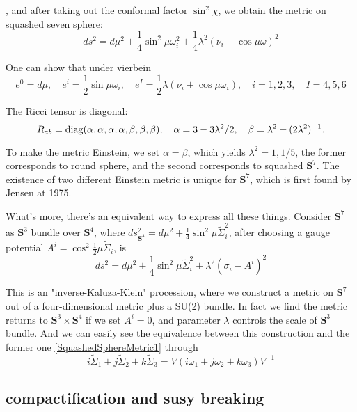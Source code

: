 \documentclass[12pt, a4paper]{article}
\numberwithin{equation}{section}
\newcommand{\be}{\begin{equation}}
\newcommand{\ee}{\end{equation}}
\begin{document}
	{\color{red}{The metric on the seven sphere is obtained by setting $\chi = $const}}, and after taking out the conformal factor $\sin^2\chi$, we obtain the metric on squashed seven sphere:
\be
	ds^2 = d\mu^2 +\frac{1}{4}\sin^2\mu\omega_i^2 + \frac{1}{4}\lambda^2 (\nu_i +\cos\mu \omega)^2
	\label{SquashedSphereMetric1}
\ee

	One can show that under vierbein
\be
	e^0 = d\mu, \quad e^i = \frac{1}{2}\sin\mu\omega_i,\quad e^I = \frac{1}{2}\lambda (\nu_i +\cos\mu\omega_i),\quad i = 1,2,3,\quad I = 4,5,6
\ee

	The Ricci tensor is diagonal:
\be
	R_{ab} = {\rm diag}(\alpha, \alpha, \alpha, \alpha, \beta, \beta, \beta),\quad \alpha = 3-3\lambda^2/2,\quad \beta = \lambda^2 + (2\lambda^2)^{-1}.
\ee
	
	To make the metric Einstein, we set $\alpha = \beta$, which yields $\lambda^2 = 1, 1/5$, the former corresponds to round sphere, and the second corresponds to squashed $\mathbf{S}^7$. The existence of two different Einstein metric is unique for $\mathbf{S}^7$, which is first found by Jensen at 1975.\cite{Jensen:1975}
	
	What's more, there's an equivalent way to express all these things. Consider $\mathbf{S}^7$ as $\mathbf{S}^3$ bundle over $\mathbf{S}^4$, where $ds^2_{\mathbf{S}^4} = d\mu^2 + \frac{1}{4}\sin^2\mu\tilde{\Sigma}_i^2$, after choosing a gauge potential $A^i = \cos^2\frac{1}{2}\mu\tilde{\Sigma}_i$, is
\be
	ds^2 = d\mu^2 + \frac{1}{4}\sin^2\mu\tilde{\Sigma}_i^2 + \lambda^2 (\sigma_i - A^i)^2
	\label{nextDs2}
\ee

	This is an "inverse-Kaluza-Klein" procession, where we construct a metric on $\mathbf{S}^7$ out of a four-dimensional metric plus a SU(2) bundle. In fact we find the metric returns to $\mathbf{S}^3 \times \mathbf{S}^4$ if we set $A^i = 0$, and parameter $\lambda$ controls the scale of $\mathbf{S}^3$ bundle. And we can easily see the equivalence between this construction and the former one \ref{SquashedSphereMetric1} through
\be
	i\tilde{\Sigma}_1 + j\tilde{\Sigma}_2 + k\tilde{\Sigma}_3 = V(i\omega_1  + j\omega_2 + k\omega_3)V^{-1}
\ee

	\subsection{compactification and susy breaking}
	
\end{document}
